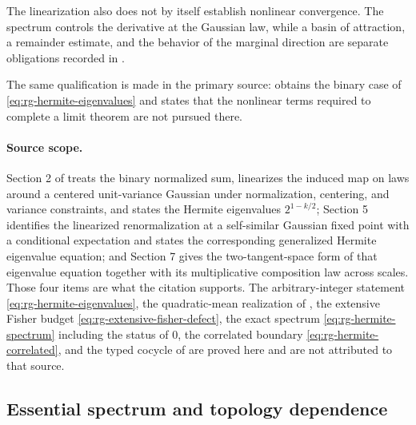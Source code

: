 The linearization also does not by itself establish nonlinear convergence.  The
spectrum controls the derivative at the Gaussian law, while a basin of
attraction, a remainder estimate, and the behavior of the marginal direction are
separate obligations recorded in . 

The same
qualification is made in the primary source: \citet{JonaLasinio2001} obtains the
binary case of \eqref{eq:rg-hermite-eigenvalues} and states that the nonlinear
terms required to complete a limit theorem are not pursued there.

\paragraph{Source scope.}
Section 2 of \citet{JonaLasinio2001} treats the binary normalized sum, linearizes
the induced map on laws around a centered unit-variance Gaussian under
normalization, centering, and variance constraints, and states the Hermite
eigenvalues \(2^{1-k/2}\); Section 5 identifies the linearized renormalization
at a self-similar Gaussian fixed point with a conditional expectation and states
the corresponding generalized Hermite eigenvalue equation; and Section 7 gives
the two-tangent-space form of that eigenvalue equation together with its
multiplicative composition law across scales.  Those four items are what the
citation supports.  The arbitrary-integer statement
\eqref{eq:rg-hermite-eigenvalues}, the quadratic-mean realization of
, the extensive Fisher budget
\eqref{eq:rg-extensive-fisher-defect}, the exact spectrum
\eqref{eq:rg-hermite-spectrum} including the status of \(0\), the correlated
boundary \eqref{eq:rg-hermite-correlated}, and the typed cocycle of
 are proved here and are not attributed to that
source. 

\subsection{Essential spectrum and topology dependence}
\label{sec:rg-action-spectrum-topology}

